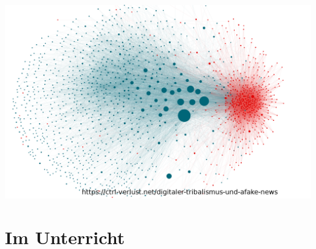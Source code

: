 \documentclass[12pt]{beamer}
\begin{document}
\begin{frame}
\begin{itemize}
{\begin{minipage}{\linewidth}
          \centering
          \includegraphics[height=0.5\textheight]{img//digitaler_Tribalismus_Terrorwarnstufe_Schweden.png}
      \end{minipage}
    }      
  \end{itemize}		
\end{frame}

\section{Im Unterricht}
\subsection{}
\end{document}
